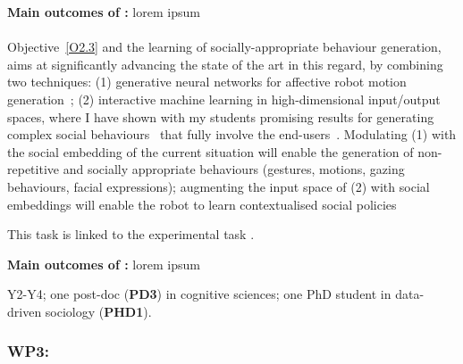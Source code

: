 \begin{framed}
    {\noindent\bf Main outcomes of \tBC:} lorem ipsum 
\end{framed}

\paragraph{\TBC}

Objective~\ref{O2.3} and the learning of socially-appropriate behaviour
generation, \project aims at significantly advancing the state of the art in
this regard, by combining two techniques: (1) generative neural networks
for affective robot motion
generation~\cite{marmpena2019generating,suguitan2020moveae}; (2) interactive
machine learning in high-dimensional input/output spaces, where I have shown
with my students promising results for generating complex social
behaviours~\cite{senft2019teaching, winkle2020couch} that fully involve the
end-users~\cite{winkle2018social}. Modulating (1) with the social embedding of
the current situation will enable the generation of non-repetitive and socially
appropriate behaviours (gestures, motions, gazing behaviours, facial
expressions); augmenting the input space of (2) with social embeddings will
enable the robot to learn contextualised social policies

This task is linked to the experimental task \tDD.

\begin{framed}
    {\noindent\bf Main outcomes of \tBB:} lorem ipsum 
\end{framed}


\begin{framed}
     Y2-Y4; one post-doc ({\bf PD3}) in cognitive
    sciences; one PhD student in data-driven sociology ({\bf PHD1}).
\end{framed}





\subsubsection{WP3: \textbf{\WPC}}

